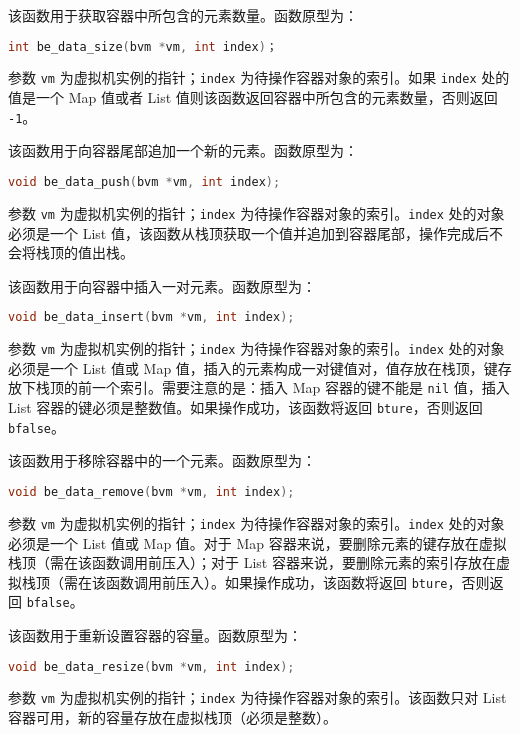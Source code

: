 
该函数用于获取容器中所包含的元素数量。函数原型为：
\begin{lstlisting}[language=c, style=berry, numbers=none]
int be_data_size(bvm *vm, int index)；
\end{lstlisting}
参数 \texttt{vm} 为虚拟机实例的指针；\texttt{index} 为待操作容器对象的索引。如果 \texttt{index} 处的值是一个 Map 值或者 List 值则该函数返回容器中所包含的元素数量，否则返回 \texttt{-1}。


该函数用于向容器尾部追加一个新的元素。函数原型为：
\begin{lstlisting}[language=c, style=berry, numbers=none]
void be_data_push(bvm *vm, int index);
\end{lstlisting}
参数 \texttt{vm} 为虚拟机实例的指针；\texttt{index} 为待操作容器对象的索引。\texttt{index} 处的对象必须是一个 List 值，该函数从栈顶获取一个值并追加到容器尾部，操作完成后不会将栈顶的值出栈。


该函数用于向容器中插入一对元素。函数原型为：
\begin{lstlisting}[language=c, style=berry, numbers=none]
void be_data_insert(bvm *vm, int index);
\end{lstlisting}
参数 \texttt{vm} 为虚拟机实例的指针；\texttt{index} 为待操作容器对象的索引。\texttt{index} 处的对象必须是一个 List 值或 Map 值，插入的元素构成一对键值对，值存放在栈顶，键存放下栈顶的前一个索引。需要注意的是：插入 Map 容器的键不能是 \texttt{nil} 值，插入 List 容器的键必须是整数值。如果操作成功，该函数将返回 \texttt{bture}，否则返回 \texttt{bfalse}。


该函数用于移除容器中的一个元素。函数原型为：
\begin{lstlisting}[language=c, style=berry, numbers=none]
void be_data_remove(bvm *vm, int index);
\end{lstlisting}
参数 \texttt{vm} 为虚拟机实例的指针；\texttt{index} 为待操作容器对象的索引。\texttt{index} 处的对象必须是一个 List 值或 Map 值。对于 Map 容器来说，要删除元素的键存放在虚拟栈顶（需在该函数调用前压入）；对于 List 容器来说，要删除元素的索引存放在虚拟栈顶（需在该函数调用前压入）。如果操作成功，该函数将返回 \texttt{bture}，否则返回 \texttt{bfalse}。


该函数用于重新设置容器的容量。函数原型为：
\begin{lstlisting}[language=c, style=berry, numbers=none]
void be_data_resize(bvm *vm, int index);
\end{lstlisting}
参数 \texttt{vm} 为虚拟机实例的指针；\texttt{index} 为待操作容器对象的索引。该函数只对 List 容器可用，新的容量存放在虚拟栈顶（必须是整数）。

